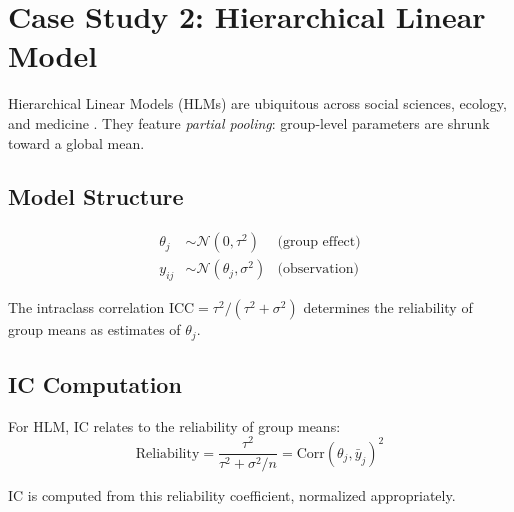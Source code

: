\documentclass[10pt]{article} %
\theoremstyle{plain}
\theoremstyle{definition}
\begin{document}
\section{Case Study 2: Hierarchical Linear Model}
\label{sec:hlm}

Hierarchical Linear Models (HLMs) are ubiquitous across social sciences, ecology, and medicine \citep{raudenbush1986hierarchical}. They feature \emph{partial pooling}: group-level parameters are shrunk toward a global mean.

\subsection{Model Structure}

\begin{align}
\theta_j &\sim \mathcal{N}(0, \tau^2) & \text{(group effect)} \\
y_{ij} &\sim \mathcal{N}(\theta_j, \sigma^2) & \text{(observation)}
\end{align}

The intraclass correlation $\text{ICC} = \tau^2 / (\tau^2 + \sigma^2)$ determines the reliability of group means as estimates of $\theta_j$.

\subsection{IC Computation}

For HLM, IC relates to the reliability of group means:
\begin{equation}
\text{Reliability} = \frac{\tau^2}{\tau^2 + \sigma^2/n} = \text{Corr}(\theta_j, \bar{y}_j)^2
\end{equation}

IC is computed from this reliability coefficient, normalized appropriately.
\end{document}
